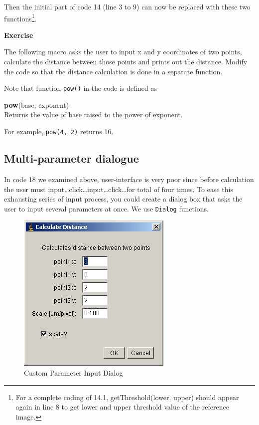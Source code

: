 \documentclass[11pt,a4paper,oneside]{report}
\newenvironment{indentexercise}[1]%
{{\setlength{\leftmargin}{2em}}%
\textbf{Exercise \thesubsection-#1}%
\begin{list}{}%
	\item%
}
{\end{list}}
\newenvironment{indentCom}%
{\begin{list}{}%
         {\setlength{\leftmargin}{1em}}%
         \item[]%
}
{\end{list}}
\newcommand{\ilcom}[1]{\texttt{\small#1}}
\begin{document}


Then the initial part of code 14 (line 3 to 9) can now be replaced with these two functions\footnote{For a complete coding of 14.1, getThreshold(lower, upper) should appear again in line 8 to get lower and upper threshold value of the reference image.}. 



\begin{indentexercise}{1}
The following macro asks the user to input x and y coordinates of two points, calculate the distance between those points and prints out the distance. Modify the code so that the distance calculation is done in a separate function. 



Note that function \ilcom{pow()} in the code is defined as
\begin{indentCom}
\textbf{pow}(base, exponent)\\
Returns the value of base raised to the power of exponent. 
\end{indentCom}
For example, \ilcom{pow(4, 2)} returns 16.
\end{indentexercise}

\subsection{Multi-parameter dialogue}
In code 18 we examined above, user-interface is very poor since before calculation the user must input\ldots click\ldots input\ldots click\ldots for total of four times. To ease this exhausting series of input process, you could create a dialog box that asks the user to input several parameters at once. We use \ilcom{Dialog} functions. 



\begin{figure}[htbp]
\begin{center}
\includegraphics[scale=0.6]{fig/fig2421_GenDialog.png}
\caption{Custom Parameter Input Dialog}
\label{figGenericDialog}
\end{center}
\end{figure} 
\end{document}

